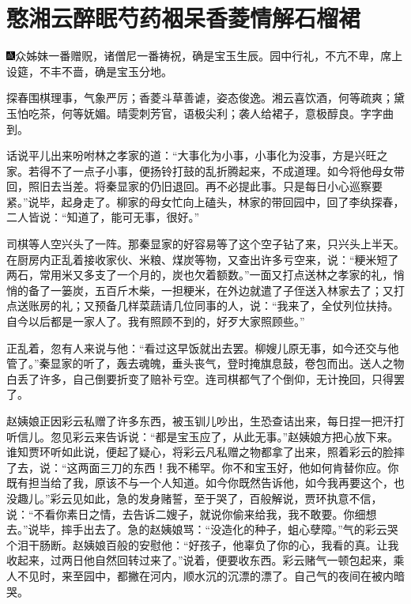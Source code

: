 
\chapter{憨湘云醉眠芍药裀\hspace{.5em}呆香菱情解石榴裙}

{\includegraphics[width=3mm]{../Images/00005}众姊妹一番赠}贶{，诸僧尼一番祷祝，确是宝玉生辰。园中行礼，不亢不卑，席上设筵，不丰不啬，确是宝玉分地。}

{探春围棋理事，气象严厉；香菱斗草善谑，姿态俊逸。湘云喜饮酒，何等疏爽；黛玉怕吃茶，何等妩媚。晴雯刺芳官，语极尖利；袭人给裙子，意极醇良。字字曲到。}

话说平儿出来吩咐林之孝家的道：``大事化为小事，小事化为没事，方是兴旺之家。若得不了一点子小事，便扬铃打鼓的乱折腾起来，不成道理。如今将他母女带回，照旧去当差。将秦显家的仍旧退回。再不必提此事。只是每日小心巡察要紧。''说毕，起身走了。柳家的母女忙向上磕头，林家的带回园中，回了李纨探春，二人皆说：``知道了，能可无事，很好。''

司棋等人空兴头了一阵。那秦显家的好容易等了这个空子钻了来，只兴头上半天。在厨房内正乱着接收家伙、米粮、煤炭等物，又查出许多亏空来，说：``粳米短了两石，常用米又多支了一个月的，炭也欠着额数。''一面又打点送林之孝家的礼，悄悄的备了一篓炭，五百斤木柴，一担粳米，在外边就遣了子侄送入林家去了；又打点送账房的礼；又预备几样菜蔬请几位同事的人，说：``我来了，全仗列位扶持。自今以后都是一家人了。我有照顾不到的，好歹大家照顾些。''

正乱着，忽有人来说与他：``看过这早饭就出去罢。柳嫂儿原无事，如今还交与他管了。''秦显家的听了，轰去魂魄，垂头丧气，登时掩旗息鼓，卷包而出。送人之物白丢了许多，自己倒要折变了赔补亏空。连司棋都气了个倒仰，无计挽回，只得罢了。

赵姨娘正因彩云私赠了许多东西，被玉钏儿吵出，生恐查诘出来，每日捏一把汗打听信儿。忽见彩云来告诉说：``都是宝玉应了，从此无事。''赵姨娘方把心放下来。谁知贾环听如此说，便起了疑心，将彩云凡私赠之物都拿了出来，照着彩云的脸摔了去，说：``这两面三刀的东西！我不稀罕。你不和宝玉好，他如何肯替你应。你既有担当给了我，原该不与一个人知道。如今你既然告诉他，如今我再要这个，也没趣儿。''彩云见如此，急的发身赌誓，至于哭了，百般解说，贾环执意不信，说：``不看你素日之情，去告诉二嫂子，就说你偷来给我，我不敢要。你细想去。''说毕，摔手出去了。急的赵姨娘骂：``没造化的种子，蛆心孽障。''气的彩云哭个泪干肠断。赵姨娘百般的安慰他：``好孩子，他辜负了你的心，我看的真。让我收起来，过两日他自然回转过来了。''说着，便要收东西。彩云赌气一顿包起来，乘人不见时，来至园中，都撇在河内，顺水沉的沉漂的漂了。自己气的夜间在被内暗哭。

